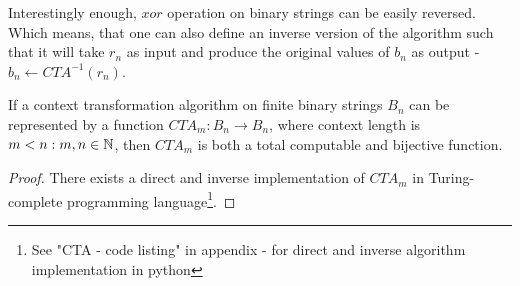 Interestingly enough, $xor$ operation on binary strings can be easily reversed. Which means, that one can also define an inverse version of the algorithm such that it will take $r_n$ as input and produce the original values of $b_n$ as output - $b_n \leftarrow {CTA}^{-1}(r_n)$.

\begin{theorem}If a context transformation algorithm on finite binary strings $B_n$ can be represented by a function ${CTA}_{m}: B_n \to B_n$, where context length is $m < n: m,n \in \mathbb{N}$, then ${CTA}_{m}$ is both a total computable and bijective function.\end{theorem}
\begin{proof}There exists a direct and inverse implementation of ${CTA}_{m}$ in Turing-complete programming language\footnote{See "CTA - code listing" in appendix - for direct and inverse algorithm implementation in python}.\end{proof}

